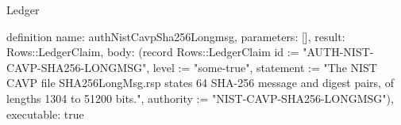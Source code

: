 \begin{lexlean}{Ledger}
\begin{semanticmodule}
definition{
  name: authNistCavpSha256Longmsg,
  parameters: [],
  result: Rows::LedgerClaim,
  body: (record Rows::LedgerClaim {id := "AUTH-NIST-CAVP-SHA256-LONGMSG", level := "some-true", statement := "The NIST CAVP file SHA256LongMsg.rsp states 64 SHA-256 message and digest pairs, of lengths 1304 to 51200 bits.", authority := "NIST-CAVP-SHA256-LONGMSG"}),
  executable: true
}
\end{semanticmodule}
\end{lexlean}
